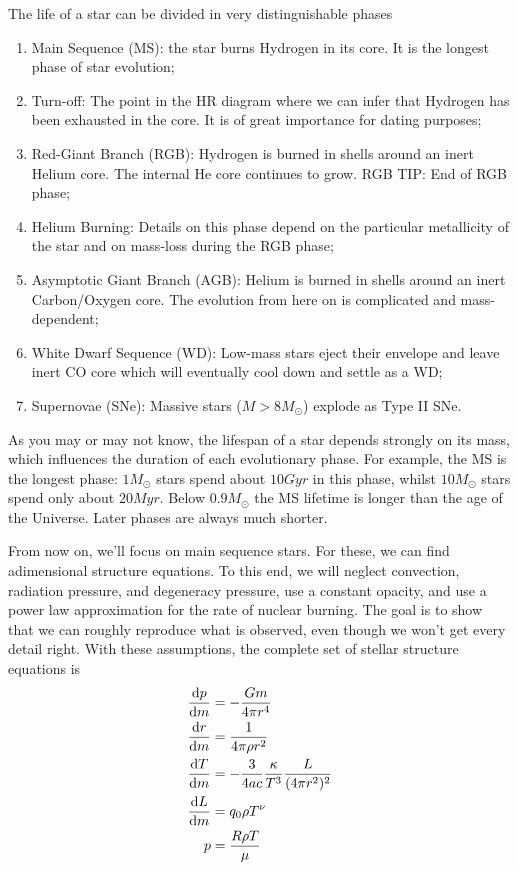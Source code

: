 The life of a star can be divided in very distinguishable phases
\begin{enumerate}
    \item Main Sequence (MS): the star burns Hydrogen in its core. It is the longest phase of star evolution;
    \item Turn-off: The point in the HR diagram where we can infer that Hydrogen has been exhausted in the core. It is of great importance for dating purposes;
    \item Red-Giant Branch (RGB): Hydrogen is burned in shells around an inert Helium core. The internal He core continues to grow. RGB TIP: End of RGB phase;
    \item Helium Burning: Details on this phase depend on the particular metallicity of the star and on mass-loss during the RGB phase;
    \item Asymptotic Giant Branch (AGB): Helium is burned in shells around an inert Carbon/Oxygen core. The evolution from here on is complicated and mass-dependent;
    \item White Dwarf Sequence (WD): Low-mass stars eject their envelope and leave inert CO core which will eventually cool down and settle as a WD;
    \item Supernovae (SNe): Massive stars ($M>8M_{\odot}$) explode as Type II SNe.
\end{enumerate}
\par As you may or may not know, the lifespan of a star depends strongly on its mass, which influences the duration of each evolutionary phase. For example, the MS is the longest phase: $1M_{\odot}$ stars spend about $10\unit{Gyr}$ in this phase, whilst $10M_{\odot}$ stars spend only about $20\unit{Myr}$. Below $0.9M_{\odot}$ the MS lifetime is longer than the age of the Universe. Later phases are always much shorter.
\par From now on, we'll focus on main sequence stars. For these, we can find adimensional structure equations. To this end, we will neglect convection, radiation pressure, and degeneracy pressure, use a constant opacity, and use a power law approximation for the rate of nuclear burning. The goal is to show that we can roughly reproduce what is observed, even though we won't get every detail right. With these assumptions, the complete set of stellar structure equations is
\begin{align*}
    \frac{\text{d}p}{\text{d}m} &= -\frac{Gm}{4\pi r^{4}}\\
    \frac{\text{d}r}{\text{d}m} &= \frac{1}{4\pi\rho r^{2}}\\
    \frac{\text{d}T}{\text{d}m} &= -\frac{3}{4ac}\frac{\kappa}{T^{3}}\frac{L}{(4\pi r^{2})^{2}}\\
    \frac{\text{d}L}{\text{d}m} &= q_{0}\rho T^{\nu}\\
    p &= \frac{R\rho T}{\mu}
\end{align*}
